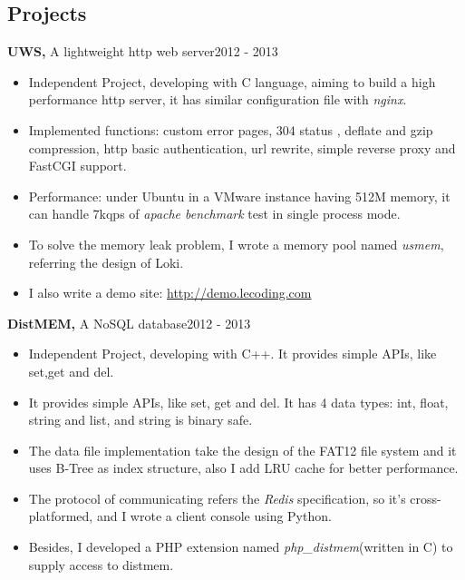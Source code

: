 \documentclass[margin]{res}
\begin{document}
\begin{resume}
\section{Projects}
{\bf UWS,} A lightweight http web server\hfill 2012 - 2013
\begin{itemize} \itemsep -2pt
  \item Independent Project, developing with C language, aiming to build a high performance http server, it has similar configuration file with {\it nginx}.
  \item Implemented functions: custom error pages, 304 status , deflate and gzip compression, http basic authentication, url rewrite, simple reverse proxy and FastCGI support.
  \item Performance: under Ubuntu in a VMware instance having 512M memory, it can handle 7kqps of {\it apache benchmark} test in single process mode.
  \item To solve the memory leak problem, I wrote a memory pool named {\it usmem}, referring the design of Loki.
  \item I also write a demo site: \href{http://demo.lecoding.com}{http://demo.lecoding.com}
\end{itemize}



{\bf DistMEM,} A NoSQL database\hfill  2012 - 2013
\begin{itemize} \itemsep -2pt
  \item Independent Project, developing with C++. It provides simple APIs, like set,get and del.
  \item It provides simple APIs, like set, get and del. It has 4 data types: int, float, string and list, and string is binary safe.
  \item The data file implementation take the design of the FAT12 file system and it uses B-Tree as index structure, also I add LRU cache for better performance. 
  \item The protocol of communicating refers the {\it Redis} specification, so it's cross-platformed, and I wrote a client console using Python.
  \item Besides, I developed a PHP extension named {\it php\_distmem}(written in C) to supply access to distmem.
\end{itemize}


\end{resume}
\end{document}
